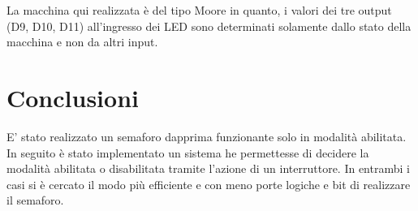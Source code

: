 La macchina qui realizzata è del tipo Moore in quanto, i valori dei tre output (D9, D10, D11) all'ingresso dei LED sono determinati solamente dallo stato della macchina e non da altri input.\\

\section{Conclusioni}
E' stato realizzato un semaforo dapprima funzionante solo in modalità abilitata. In seguito è stato implementato un sistema he permettesse di decidere la modalità abilitata o disabilitata tramite l'azione di un interruttore. In entrambi i casi si è cercato il modo più efficiente e con meno porte logiche e bit di realizzare il semaforo.